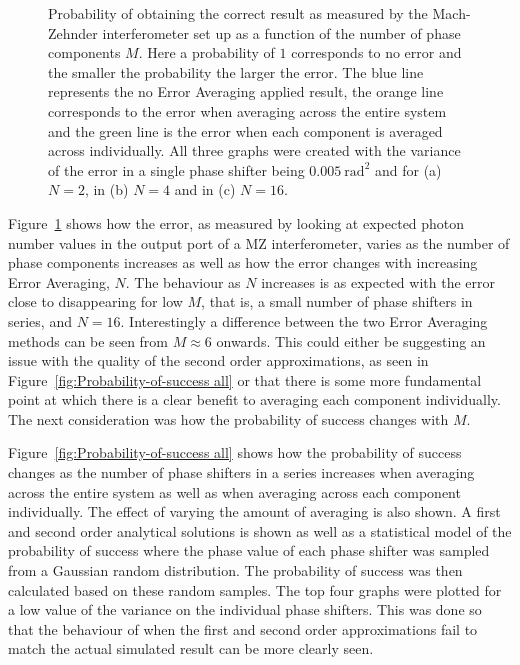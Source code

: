 \documentclass[aps,pra,twocolumn,superscriptaddress,numerical,floatfix]{revtex4-1}
\begin{document}
\begin{figure}
	\caption[Prob correct for phase systems]{Probability of obtaining the correct result as measured by the Mach-Zehnder interferometer set up as a function of the number of phase components $M$. Here a probability of $1$ corresponds to no error and the smaller the probability the larger the error. The blue line represents the no Error Averaging applied result, the orange line corresponds to the error when averaging across the entire system and the green line is the error when each component is averaged across individually. All three graphs were created with the variance of the error in a single phase shifter being $0.005\ \textrm{rad}^{2}$ and for (a) $N=2$, in (b) $N=4$ and in (c) $N=16$. \label{fig:Error-as-measured all}}
\end{figure}
%
Figure~\ref{fig:Error-as-measured all} shows how the error, as measured by looking at expected photon number values in the output port of a MZ interferometer, varies as the number of phase components increases as well as how the error changes with increasing Error Averaging, $N$. The behaviour as $N$ increases is as expected with the error close to disappearing for low $M$, that is, a small number of phase shifters in series, and $N=16$. Interestingly a difference between the two Error Averaging methods can be seen from $M\approx6$ onwards. This could either be suggesting an issue with the quality of the second order approximations, as seen in Figure~\ref{fig:Probability-of-success all} or that there is some more fundamental point at which there is a clear benefit to averaging each component individually. The next consideration was how the probability of success changes with $M$.

Figure~\ref{fig:Probability-of-success all} shows how the probability of success changes as the number of phase shifters in a series increases when averaging across the entire system as well as when averaging across each component individually. The effect of varying the amount of averaging is also shown. A first and second order analytical solutions is shown as well as a statistical model of the probability of success where the phase value of each phase shifter was sampled from a Gaussian random distribution. The probability of success was then calculated based on these random samples. The top four graphs were plotted for a low value of the variance on the individual phase shifters. This was done so that the behaviour of when the first and second order approximations fail to match the actual simulated result can be more clearly seen. 
\end{document}
